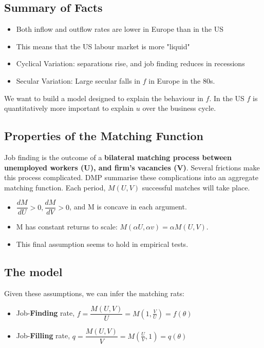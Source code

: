 \documentclass[11pt]{article}
\begin{document}
\subsection{Summary of Facts}

\begin{itemize}
    \item Both inflow and outflow rates are lower in Europe than in the US
    \item  This means that the US labour market is more "liquid"
    \item  Cyclical Variation: separations rise, and job finding reduces in recessions
    \item  Secular Variation: Large secular falls in $f$ in Europe in the 80s.
\end{itemize}

We want to build a model designed to explain the behaviour in $f$. In the US $f$ is quantitatively more important to explain $u$ over the business cycle.

\subsection{Properties of the Matching Function}

Job finding is the outcome of a \textbf{bilateral matching process between unemployed workers (U), and firm's vacancies (V)}. Several frictions make this process complicated. DMP summarise these complications into an aggregate matching function. Each period, $M(U,V)$ successful matches will take place.


\begin{itemize}
    \item $\dfrac{dM}{dU}>0, \dfrac{dM}{dV}>0$, and M is concave in each argument.
    \item M has constant returns to scale: $M(\alpha U, \alpha v) = \alpha M(U,V)$.
    \item This final assumption seems to hold in empirical tests.
\end{itemize}

\subsection{The model}

Given these assumptions, we can infer the matching rats:
\begin{itemize}
    \item Job-\textbf{Finding} rate, $f = \dfrac{M(U,V)}{U} = M(1,\frac{V}{U}) = f(\theta)$
    \item Job-\textbf{Filling} rate, $q = \dfrac{M(U,V)}{V} = M(\frac{U}{V},1) = q(\theta)$
\end{itemize}
\end{document}
